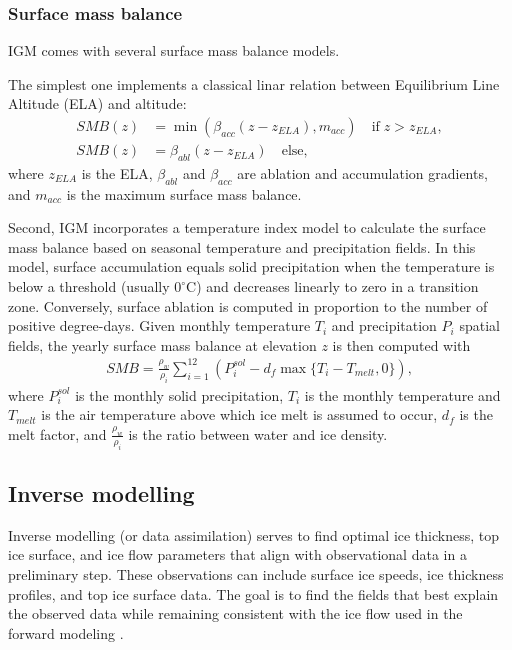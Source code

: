 \documentclass[10pt,twocolumn]{article}
\begin{document}
\subsubsection{Surface mass balance}
\label{phys_smb}

IGM comes with several surface mass balance models.

The simplest one implements a classical
linar relation between Equilibrium Line Altitude (ELA) and altitude:
\begin{align}
SMB(z) & = \min(\beta_{acc} (z-z_{ELA}),m_{acc})\quad\textrm{if}\;z>z_{ELA}, \label{smb1} \\
SMB(z) & = \beta_{abl} (z-z_{ELA})\quad\textrm{else}, \label{smb2} 
\end{align}
where $z_{ELA}$ is the ELA, $\beta_{abl}$ and $\beta_{acc}$
are ablation and accumulation gradients, and $m_{acc}$ is the maximum surface mass balance.
 
Second, IGM incorporates a temperature index model \citep{hock2003} to calculate the 
surface mass balance based on seasonal temperature and precipitation fields.
In this model, surface accumulation equals solid precipitation when the temperature is 
below a threshold (usually $0^{\circ}$C) and decreases linearly to zero in a transition zone.
Conversely, surface ablation is computed in proportion to the number of positive degree-days.
Given monthly temperature $T_i$ and precipitation $P_i$ spatial fields, 
the yearly surface mass balance at elevation $z$ is then computed with 
\begin{align}
SMB = \frac{\rho_w}{\rho_i} \sum_{i=1}^{12} \left( P_i^{sol} - d_f \max \{ T_i - T_{melt}, 0 \} \right),
\label{smb3} 
\end{align}
where $P_i^{sol}$ is the monthly solid precipitation, $T_i$ is the monthly temperature 
and $T_{melt}$ is the air temperature above which ice melt is assumed to occur, 
$d_f$ is the melt factor,
and $\frac{\rho_w}{\rho_i}$ is the ratio between water and ice density.

 
\subsection{Inverse modelling}
\label{inv_model} 

Inverse modelling (or data assimilation) serves to find optimal ice thickness, 
top ice surface, and ice flow parameters that align with observational data in a preliminary step.
These observations can include surface ice speeds, ice thickness profiles, and top ice surface data. 
The goal is to find the fields that best explain the observed data while 
remaining consistent with the ice flow used in the forward modeling \citep{jouvet2023inversion}.
  
\end{document}
